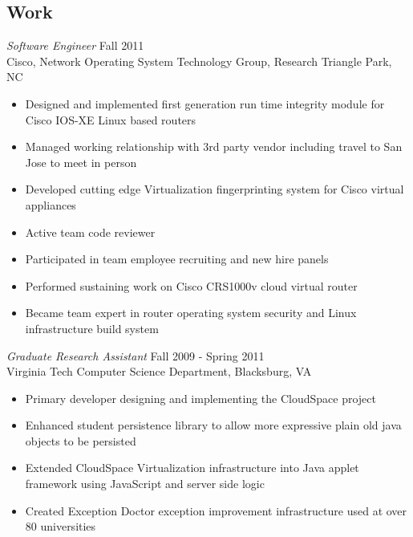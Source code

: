 \documentclass[line,margin]{res}
\begin{document}
\begin{resume}
\section{Work}
        {\sl Software Engineer} \hfill Fall 2011 \\
           Cisco, Network Operating System Technology Group, Research Triangle Park, NC
              \begin{itemize}  \itemsep -2pt %
                 \item Designed and implemented first generation run time integrity
                  module for Cisco IOS-XE Linux based routers
                 \item Managed working relationship with 3rd party vendor including
                   travel to San Jose to meet in person
                 \item Developed cutting edge Virtualization fingerprinting system for
                   Cisco virtual appliances
                 \item Active team code reviewer
                 \item Participated in team employee recruiting and new hire panels
                 \item Performed sustaining work on Cisco CRS1000v cloud virtual router
                 \item Became team expert in router operating system security and
                   Linux infrastructure build system
              \end{itemize}
        {\sl Graduate Research Assistant} \hfill  Fall 2009 - Spring 2011 \\
           Virginia Tech Computer Science Department, Blacksburg, VA
              \begin{itemize} \itemsep -2pt %
                   \item Primary developer designing and implementing the CloudSpace project
                   \item Enhanced student persistence library to allow more
                     expressive plain old java objects to be persisted
                   \item Extended CloudSpace Virtualization infrastructure
                     into Java applet framework using JavaScript and server side logic
                   \item Created Exception Doctor exception improvement infrastructure used at over 80 universities
              \end{itemize}

\end{resume}
\end{document}
